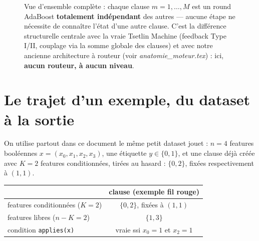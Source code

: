 \documentclass[12pt,a4paper]{article}
\newcommand{\code}[1]{\texttt{#1}}
\theoremstyle{remark}
\begin{document}
\begin{figure}[h]
\caption{Vue d'ensemble complète : chaque clause $m=1,\dots,M$ est un round
AdaBoost \textbf{totalement indépendant} des autres --- aucune étape ne
nécessite de connaître l'état d'une autre clause. C'est la différence
structurelle centrale avec la vraie Tsetlin Machine (feedback Type I/II,
couplage via la somme globale des clauses) et avec notre ancienne architecture
à routeur (voir \emph{anatomie\_moteur.tex}) : ici, \textbf{aucun routeur, à
aucun niveau}.}
\label{fig:master-overview}
\end{figure}

\section{Le trajet d'un exemple, du dataset à la sortie}

On utilise partout dans ce document le même petit dataset jouet : $n=4$
features booléennes $x=(x_0,x_1,x_2,x_3)$, une étiquette $y\in\{0,1\}$, et une
clause déjà créée avec $K=2$ features conditionnées, tirées au hasard :
$\{0,2\}$, fixées respectivement à $(1,1)$.

\begin{center}
\renewcommand{\arraystretch}{1.25}
\begin{tabular}{lc}
\toprule
 & \textbf{clause (exemple fil rouge)} \\
\midrule
features conditionnées ($K=2$) & $\{0,2\}$, fixées à $(1,1)$ \\
features libres ($n-K=2$)      & $\{1,3\}$ \\
condition \code{applies(x)}    & vraie ssi $x_0{=}1$ et $x_2{=}1$ \\
\bottomrule
\end{tabular}
\end{center}
\end{document}
